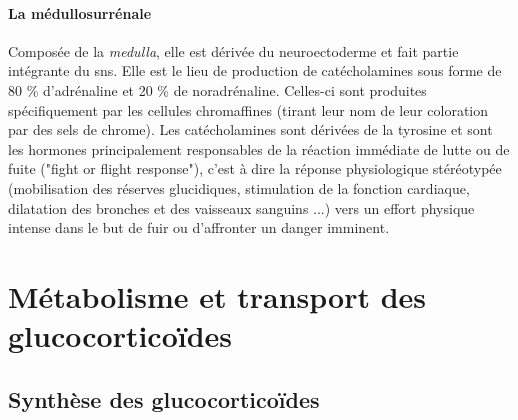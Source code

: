 \documentclass[../main.tex]{subfiles}
\begin{document}
\paragraph{La médullosurrénale}
Composée de la \textit{medulla}, elle est dérivée du neuroectoderme et fait partie intégrante du \gls{sns}.
Elle est le lieu de production de catécholamines sous forme de 80 \% d'adrénaline et 20 \% de noradrénaline.
Celles-ci sont produites spécifiquement par les cellules chromaffines (tirant leur nom de leur coloration par des sels de chrome).
Les catécholamines sont dérivées de la tyrosine et sont les hormones principalement responsables de la réaction immédiate de lutte ou de fuite ("fight or flight response"), c'est à dire la réponse physiologique stéréotypée (mobilisation des réserves glucidiques, stimulation de la fonction cardiaque, dilatation des bronches et des vaisseaux sanguins ...) vers un effort physique intense dans le but de fuir ou d'affronter un danger imminent.





\section{Métabolisme et transport des glucocorticoïdes}


\subsection{Synthèse des glucocorticoïdes}
\end{document}
